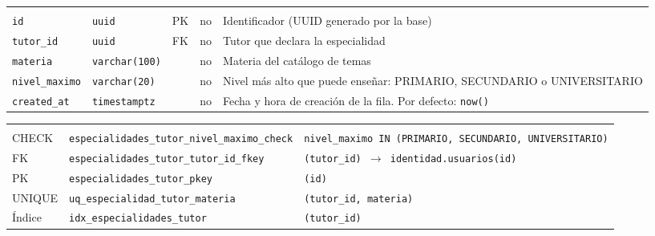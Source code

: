 {\small
\begin{xltabular}{\textwidth}{@{}>{\raggedright\arraybackslash}p{3.6cm} >{\raggedright\arraybackslash}p{2.3cm} >{\raggedright\arraybackslash}p{1cm} >{\centering\arraybackslash}p{0.85cm} L@{}}
    \toprule
     &  &  &  &  \\
    \midrule
    \endfirsthead
    \toprule
     &  &  &  &  \\
    \midrule
    \endhead
    \bottomrule
    \endfoot
    \texttt{id} & \texttt{uuid} & PK & no & Identificador (UUID generado por la base) \\
    \texttt{tutor\_\allowbreak{}id} & \texttt{uuid} & FK & no & Tutor que declara la especialidad \\
    \texttt{materia} & \texttt{varchar(\allowbreak{}100)} &  & no & Materia del catálogo de temas \\
    \texttt{nivel\_\allowbreak{}maximo} & \texttt{varchar(\allowbreak{}20)} &  & no & Nivel más alto que puede enseñar: PRIMARIO, SECUNDARIO o UNIVERSITARIO \\
    \texttt{created\_\allowbreak{}at} & \texttt{timestamptz} &  & no & Fecha y hora de creación de la fila. Por defecto: \texttt{now(\allowbreak{})} \\
\end{xltabular}
}

{\small
\begin{xltabular}{\textwidth}{@{}>{\raggedright\arraybackslash}p{1.7cm} >{\raggedright\arraybackslash}p{4.6cm} L@{}}
    \toprule
     &  &  \\
    \midrule
    \endfirsthead
    \toprule
     &  &  \\
    \midrule
    \endhead
    \bottomrule
    \endfoot
    CHECK & \texttt{especialidades\_\allowbreak{}tutor\_\allowbreak{}nivel\_\allowbreak{}maximo\_\allowbreak{}check} & \texttt{nivel\_\allowbreak{}maximo IN (\allowbreak{}\textquotesingle{}PRIMARIO\textquotesingle{},\allowbreak{} \textquotesingle{}SECUNDARIO\textquotesingle{},\allowbreak{} \textquotesingle{}UNIVERSITARIO\textquotesingle{})} \\
    FK & \texttt{especialidades\_\allowbreak{}tutor\_\allowbreak{}tutor\_\allowbreak{}id\_\allowbreak{}fkey} & \texttt{(\allowbreak{}tutor\_\allowbreak{}id) $\rightarrow$ identidad.usuarios(\allowbreak{}id)} \\
    PK & \texttt{especialidades\_\allowbreak{}tutor\_\allowbreak{}pkey} & \texttt{(\allowbreak{}id)} \\
    UNIQUE & \texttt{uq\_\allowbreak{}especialidad\_\allowbreak{}tutor\_\allowbreak{}materia} & \texttt{(\allowbreak{}tutor\_\allowbreak{}id,\allowbreak{} materia)} \\
    Índice & \texttt{idx\_\allowbreak{}especialidades\_\allowbreak{}tutor} & \texttt{(\allowbreak{}tutor\_\allowbreak{}id)} \\
\end{xltabular}
}

